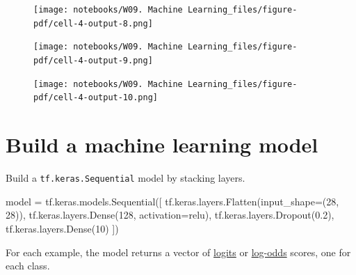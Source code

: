 \documentclass[
  letterpaper,
  DIV=11,
  numbers=noendperiod]{scrreprt}
\newenvironment{Shaded}{\begin{snugshade}}{\end{snugshade}}
\newcommand{\DecValTok}[1]{\textcolor[rgb]{0.68,0.00,0.00}{#1}}
\newcommand{\FloatTok}[1]{\textcolor[rgb]{0.68,0.00,0.00}{#1}}
\newcommand{\NormalTok}[1]{\textcolor[rgb]{0.00,0.23,0.31}{#1}}
\newcommand{\OperatorTok}[1]{\textcolor[rgb]{0.37,0.37,0.37}{#1}}
\newcommand{\StringTok}[1]{\textcolor[rgb]{0.13,0.47,0.30}{#1}}
\begin{document}
\begin{figure}[H]

{\centering \texttt{[image: notebooks/W09. Machine Learning\_files/figure-pdf/cell-4-output-8.png]}

}

\end{figure}

\begin{figure}[H]

{\centering \texttt{[image: notebooks/W09. Machine Learning\_files/figure-pdf/cell-4-output-9.png]}

}

\end{figure}

\begin{figure}[H]

{\centering \texttt{[image: notebooks/W09. Machine Learning\_files/figure-pdf/cell-4-output-10.png]}

}

\end{figure}

\hypertarget{build-a-machine-learning-model}{%
\section{Build a machine learning
model}\label{build-a-machine-learning-model}}

Build a \texttt{tf.keras.Sequential} model by stacking layers.

\begin{Shaded}
\begin{Highlighting}[]
\NormalTok{model }\OperatorTok{=}\NormalTok{ tf.keras.models.Sequential([}
\NormalTok{  tf.keras.layers.Flatten(input\_shape}\OperatorTok{=}\NormalTok{(}\DecValTok{28}\NormalTok{, }\DecValTok{28}\NormalTok{)),}
\NormalTok{  tf.keras.layers.Dense(}\DecValTok{128}\NormalTok{, activation}\OperatorTok{=}\StringTok{\textquotesingle{}relu\textquotesingle{}}\NormalTok{),}
\NormalTok{  tf.keras.layers.Dropout(}\FloatTok{0.2}\NormalTok{),}
\NormalTok{  tf.keras.layers.Dense(}\DecValTok{10}\NormalTok{)}
\NormalTok{])}
\end{Highlighting}
\end{Shaded}

For each example, the model returns a vector of
\href{https://developers.google.com/machine-learning/glossary\#logits}{logits}
or
\href{https://developers.google.com/machine-learning/glossary\#log-odds}{log-odds}
scores, one for each class.
\end{document}
